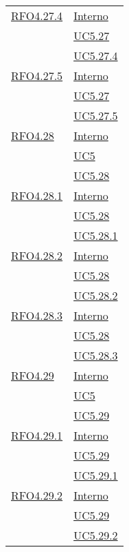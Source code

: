 \begin{longtable}{|>{\centering}m{5cm}|m{5cm}<{\centering}|}
\hyperlink{RFO4.27.4}{RFO4.27.4}  &\hyperlink{Interno}{Interno}\\ &\hyperref[UC5.27]{UC5.27}\\ &\hyperref[UC5.27.4]{UC5.27.4}\\ \hline

\hyperlink{RFO4.27.5}{RFO4.27.5} & \hyperlink{Interno}{Interno}\\ &\hyperref[UC5.27]{UC5.27}\\ &\hyperref[UC5.27.5]{UC5.27.5}\\ \hline

\hyperlink{RFO4.28}{RFO4.28} &  \hyperlink{Interno}{Interno}\\ &\hyperref[UC5]{UC5}\\ &\hyperref[UC5.28]{UC5.28}\\ \hline

\hyperlink{RFO4.28.1}{RFO4.28.1} &  \hyperlink{Interno}{Interno}\\ &\hyperref[UC5.28]{UC5.28}\\ &\hyperref[UC5.28.1]{UC5.28.1}\\ \hline

\hyperlink{RFO4.28.2}{RFO4.28.2} &  \hyperlink{Interno}{Interno}\\ &\hyperref[UC5.28]{UC5.28}\\ &\hyperref[UC5.28.2]{UC5.28.2}\\ \hline

\hyperlink{RFO4.28.3}{RFO4.28.3} & \hyperlink{Interno}{Interno}\\ &\hyperref[UC5.28]{UC5.28}\\ &\hyperref[UC5.28.3]{UC5.28.3}\\ \hline

\hyperlink{RFO4.29}{RFO4.29} & \hyperlink{Interno}{Interno}\\ &\hyperref[UC5]{UC5}\\ &\hyperref[UC5.29]{UC5.29}\\ \hline

\hyperlink{RFO4.29.1}{RFO4.29.1} & \hyperlink{Interno}{Interno}\\ &\hyperref[UC5.29]{UC5.29}\\ &\hyperref[UC5.29.1]{UC5.29.1}\\ \hline

\hyperlink{RFO4.29.2}{RFO4.29.2} &  \hyperlink{Interno}{Interno}\\ &\hyperref[UC5.29]{UC5.29}\\ &\hyperref[UC5.29.2]{UC5.29.2}\\ \hline


\end{longtable}
